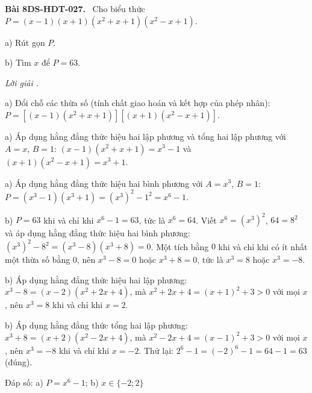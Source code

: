 \documentclass[12pt,a4paper]{article}
\newenvironment{problem}[1][]{\par\medskip\noindent\textbf{Bài #1.}\ }{\par}
\newenvironment{solution}[1][]{\par\noindent\textit{Lời giải #1.}\par}{\par}
\begin{document}
\begin{problem}[8DS-HDT-027]
Cho biểu thức $P = (x - 1)(x + 1)(x^2 + x + 1)(x^2 - x + 1)$.

a) Rút gọn $P$.

b) Tìm $x$ để $P = 63$.

\begin{solution}
a) Đổi chỗ các thừa số (tính chất giao hoán và kết hợp của phép nhân): $P = \left[(x - 1)(x^2 + x + 1)\right]\left[(x + 1)(x^2 - x + 1)\right]$.

a) Áp dụng hằng đẳng thức hiệu hai lập phương và tổng hai lập phương với $A = x$, $B = 1$: $(x - 1)(x^2 + x + 1) = x^3 - 1$ và $(x + 1)(x^2 - x + 1) = x^3 + 1$.

a) Áp dụng hằng đẳng thức hiệu hai bình phương với $A = x^3$, $B = 1$: $P = (x^3 - 1)(x^3 + 1) = (x^3)^2 - 1^2 = x^6 - 1$.

b) $P = 63$ khi và chỉ khi $x^6 - 1 = 63$, tức là $x^6 = 64$. Viết $x^6 = (x^3)^2$, $64 = 8^2$ và áp dụng hằng đẳng thức hiệu hai bình phương: $(x^3)^2 - 8^2 = (x^3 - 8)(x^3 + 8) = 0$. Một tích bằng $0$ khi và chỉ khi có ít nhất một thừa số bằng $0$, nên $x^3 - 8 = 0$ hoặc $x^3 + 8 = 0$, tức là $x^3 = 8$ hoặc $x^3 = -8$.

b) Áp dụng hằng đẳng thức hiệu hai lập phương: $x^3 - 8 = (x - 2)(x^2 + 2x + 4)$, mà $x^2 + 2x + 4 = (x + 1)^2 + 3 > 0$ với mọi $x$, nên $x^3 = 8$ khi và chỉ khi $x = 2$.

b) Áp dụng hằng đẳng thức tổng hai lập phương: $x^3 + 8 = (x + 2)(x^2 - 2x + 4)$, mà $x^2 - 2x + 4 = (x - 1)^2 + 3 > 0$ với mọi $x$, nên $x^3 = -8$ khi và chỉ khi $x = -2$. Thử lại: $2^6 - 1 = (-2)^6 - 1 = 64 - 1 = 63$ (đúng).

Đáp số: a) $\boxed{P = x^6 - 1}$; b) $\boxed{x \in \{-2; 2\}}$
\end{solution}
\end{problem}
\end{document}
